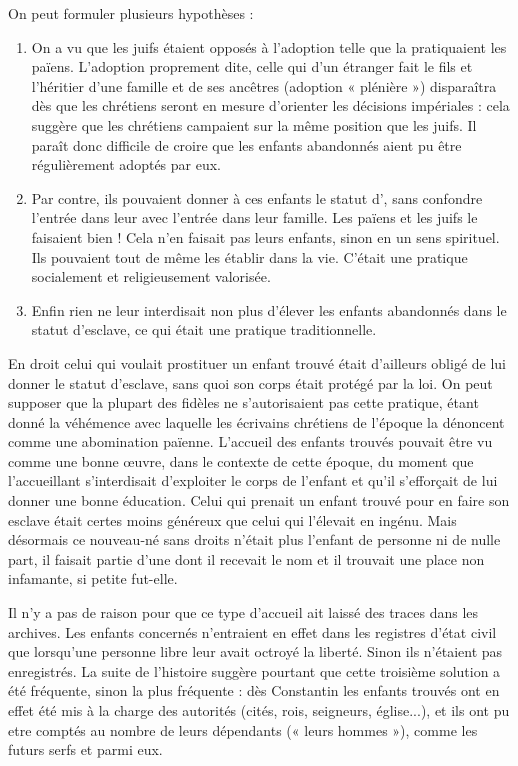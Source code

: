  On peut formuler plusieurs hypothèses :
\begin{enumerate}
\item On a vu que les juifs étaient opposés à l'adoption telle que la pratiquaient les païens. L'adoption proprement dite, celle qui d'un étranger fait le fils et l'héritier d'une famille et de ses ancêtres (adoption « plénière ») disparaîtra dès que les chrétiens seront en mesure d'orienter les décisions impériales : cela suggère que les chrétiens campaient sur la même position que les juifs. Il paraît donc difficile de croire que les enfants abandonnés aient pu être régulièrement adoptés par eux.
\item Par contre, ils pouvaient donner à ces enfants le statut d', sans confondre l'entrée dans leur  avec l'entrée dans leur famille. Les païens et les juifs le faisaient bien ! Cela n'en faisait pas leurs enfants, sinon en un sens spirituel. Ils pouvaient tout de même les établir dans la vie. C'était une pratique socialement et religieusement valorisée.
\item Enfin rien ne leur interdisait non plus d'élever les enfants abandonnés dans le statut d'esclave, ce qui était une pratique traditionnelle. 
\end{enumerate} 

 En droit celui qui voulait prostituer un enfant trouvé était d'ailleurs obligé de lui donner le statut d'esclave, sans quoi son corps était protégé par la loi. On peut supposer que la plupart des fidèles ne s'autorisaient pas cette pratique, étant donné la véhémence avec laquelle les écrivains chrétiens de l'époque la dénoncent comme une abomination païenne. L'accueil des enfants trouvés pouvait être vu comme une bonne œuvre, dans le contexte de cette époque, du moment que l'accueillant s'interdisait d'exploiter le corps de l'enfant et qu'il s'efforçait de lui donner une bonne éducation. Celui qui prenait un enfant trouvé pour en faire son esclave était certes moins généreux que celui qui l'élevait en ingénu. Mais désormais ce nouveau-né sans droits n'était plus l'enfant de personne ni de nulle part, il faisait partie d'une  dont il recevait le nom et il trouvait une place non infamante, si petite fut-elle.

 Il n'y a pas de raison pour que ce type d'accueil ait laissé des traces dans les archives. Les enfants concernés n'entraient en effet dans les registres d'état civil que lorsqu'une personne libre leur avait octroyé la liberté. Sinon ils n'étaient pas enregistrés. La suite de l'histoire suggère pourtant que cette troisième solution a été fréquente, sinon la plus fréquente : dès Constantin les enfants trouvés ont en effet été mis à la charge des autorités (cités, rois, seigneurs, église...), et ils ont pu etre comptés au nombre de leurs dépendants (« leurs hommes »), comme les futurs serfs et parmi eux. 
 


